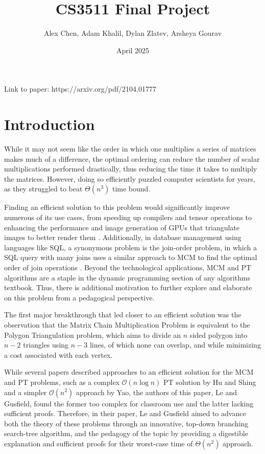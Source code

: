 \documentclass[12pt]{article}
\title{CS3511 Final Project}
\author{Alex Chen, Adam Khalil, Dylan Zlatev, Arsheya Gourav}
\date{April 2025}
\newcommand{\bigO}{\mathcal{O}}
\begin{document}
\maketitle

Link to paper: https://arxiv.org/pdf/2104.01777

\section{Introduction}
While it may not seem like the order in which one multiplies a series of matrices makes much of a difference, the optimal ordering can reduce the number of scalar multiplications performed drastically, thus reducing the time it takes to multiply the matrices. However, doing so efficiently puzzled computer scientists for years, as they struggled to beat $\Theta(n^3)$ time bound. 

Finding an efficient solution to this problem would significantly improve numerous of its use cases, from speeding up compilers and tensor operations to enhancing the performance and image generation of GPUs that triangulate images to better render them \cite{Eberly}. Additionally, in database management using languages like SQL, a synonymous problem is the join-order problem, in which a SQL query with many joins uses a similar approach to MCM to find the optimal order of join operations \cite{Selinger}. Beyond the technological applications, MCM and PT algorithms are a staple in the dynamic programming section of any algorithms textbook. Thus, there is additional motivation to further explore and elaborate on this problem from a pedagogical perspective. 

The first major breakthrough that led closer to an efficient solution was the observation that the Matrix Chain Multiplication Problem is equivalent to the Polygon Triangulation problem, which aims to divide an $n$ sided polygon into $n-2$ triangles using $n-3$ lines, of which none can overlap, and while minimizing a cost associated with each vertex. 

While several papers described approaches to an efficient solution for the MCM and PT problems, such as a complex $\bigO(n\log n)$ PT solution by Hu and Shing and a simpler $\bigO(n^2)$ approach by Yao, the authors of this paper, Le and Gusfield, found the former too complex for classroom use and the latter lacking sufficient proofs. Therefore, in their paper, Le and Gusfield aimed to advance both the theory of these problems through an innovative, top-down branching search-tree algorithm, and the pedagogy of the topic by providing a digestible explanation and sufficient proofs for their worst-case time of $\Theta(n^2)$ approach. 
\end{document}
